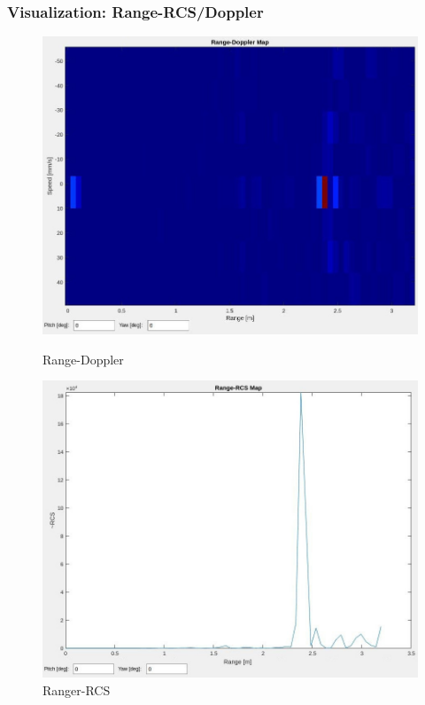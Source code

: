 \documentclass[aspectratio=169]{beamer}
\begin{document}
\begin{frame}[fragile]
  \frametitle{Visualization: Range-RCS/Doppler}
  \begin{figure}[!htb]
    \begin{minipage}{0.48\textwidth}
      \centering
      \includegraphics[width=\textwidth]{../img/vis_range_dop.jpg}
      \caption{Range-Doppler}
    \end{minipage}\hfill
    \begin{minipage}{0.48\textwidth}
      \centering
      \includegraphics[width=\textwidth]{../img/vis_range_rcs.jpg}
      \caption{Ranger-RCS}
    \end{minipage}
  \end{figure}
\end{frame}
\end{document}
